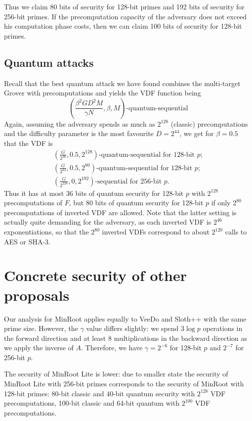 \documentclass{article}
\begin{document}
Thus we claim 80 bits of security for 128-bit primes and 192 bits of security for 256-bit primes. If the precomputation capacity of the adversary does not exceed his computation phase costs, then we can claim 100 bits of security for 128-bit primes.


\subsection{ Quantum attacks}

Recall that the best quantum attack we have found combines the  multi-target Grover with precomputations and yields the VDF function being 
$$
\left(\frac{\beta^2 G D^2M}{\gamma N},\beta,M\right)\text{-quantum-sequential}
$$
Again, assuming the adversary spends as much as $2^{128}$ (classic) precomputations
and the difficulty parameter is the most favourite $D=2^{44}$, we get for $\beta=0.5$ that the VDF is
\begin{align}
(\frac{G}{2^{36}},0.5,2^{128})\text{-quantum-sequential for 128-bit }p;\\
(\frac{G}{2^{84}},0.5,2^{80})\text{-quantum-sequential for 128-bit }p;\\
(\frac{G}{2^{228}},0,2^{192})\text{-sequential for 256-bit }p.
\end{align}
Thus it has at most $36$ bits of quantum security for 128-bit $p$ with $2^{128}$ precomputations of $F$, but 80 bits of quantum security for 128-bit $p$ if only $2^{80}$ precomputations of inverted VDF are allowed. Note that the latter setting is actually quite demanding for the adversary, as each inverted VDF is $2^{46}$ exponentiations, so that the $2^{80}$ inverted VDFs correspond to about $2^{120}$ calls to AES or SHA-3. 


\section{Concrete security of other proposals}

Our analysis for MinRoot applies equally to VeeDo and Sloth++ with the same prime size. However, the $\gamma$ value differs slightly: we spend $3\log p$ operations in the forward direction and at least $8$ multiplications in the backward direction as we apply the inverse of $A$. Therefore, we have $\gamma = 2^{-6}$ for 128-bit $p$ and $2^{-7}$ for 256-bit $p$.

The security of MinRoot Lite is lower: due to smaller state the security of MinRoot Lite with 256-bit primes corresponds to the security of MinRoot with 128-bit primes: 80-bit classic and 40-bit quantum security with $2^{128}$ VDF precomputations, 100-bit classic and 64-bit quantum with $2^{100}$ VDF precomputations.
\end{document}
